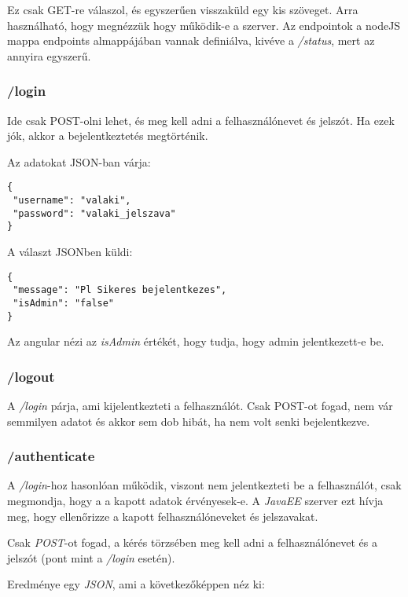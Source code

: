 \documentclass[]{article}
\begin{document}
Ez csak GET-re válaszol, és egyszerűen visszaküld egy kis szöveget. Arra használható, hogy megnézzük hogy működik-e a szerver. Az endpointok a nodeJS mappa endpoints almappájában vannak definiálva, kivéve a \textit{/status}, mert az annyira egyszerű.

\subsubsection{/login}

Ide csak POST-olni lehet, és meg kell adni a felhasználónevet és jelszót. Ha ezek jók, akkor a bejelentkeztetés megtörténik.

\noindent
Az adatokat JSON-ban várja:

\bigskip
\begin{lstlisting}
{
 "username": "valaki",
 "password": "valaki_jelszava"
}
\end{lstlisting}

\noindent
A választ JSONben küldi:

\bigskip
\begin{lstlisting}
{
 "message": "Pl Sikeres bejelentkezes",
 "isAdmin": "false"
}
\end{lstlisting}

\noindent
Az angular nézi az \textit{isAdmin} értékét, hogy tudja, hogy admin jelentkezett-e be.

\subsubsection{/logout}

A \textit{/login} párja, ami kijelentkezteti a felhasználót. Csak POST-ot fogad, nem vár semmilyen adatot és akkor sem dob hibát, ha nem volt senki bejelentkezve.

\subsubsection{/authenticate}

A \textit{/login}-hoz hasonlóan működik, viszont nem jelentkezteti be a felhasználót, csak megmondja, hogy a a kapott adatok 
érvényesek-e. A \textit{JavaEE} szerver ezt hívja meg, hogy ellenőrizze a kapott felhasználóneveket és jelszavakat.

Csak \textit{POST}-ot fogad, a kérés törzsében meg kell adni a felhasználónevet és a jelszót (pont mint a \textit{/login} esetén).

Eredménye egy \textit{JSON}, ami a következőképpen néz ki:
\end{document}
